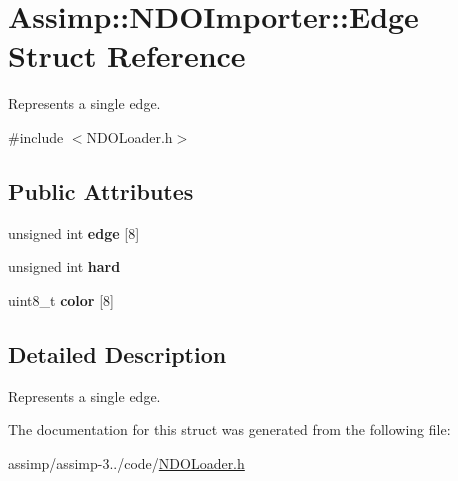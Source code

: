 \hypertarget{struct_assimp_1_1_n_d_o_importer_1_1_edge}{\section{Assimp\+:\+:N\+D\+O\+Importer\+:\+:Edge Struct Reference}
\label{struct_assimp_1_1_n_d_o_importer_1_1_edge}
}


Represents a single edge.  




{\ttfamily \#include $<$N\+D\+O\+Loader.\+h$>$}

\subsection*{Public Attributes}
\begin{DoxyCompactItemize}
\item 
\hypertarget{struct_assimp_1_1_n_d_o_importer_1_1_edge_ac715afd285e42a2427e72c70136ed252}{unsigned int {\bfseries edge} \mbox{[}8\mbox{]}}\label{struct_assimp_1_1_n_d_o_importer_1_1_edge_ac715afd285e42a2427e72c70136ed252}

\item 
\hypertarget{struct_assimp_1_1_n_d_o_importer_1_1_edge_aa2ca27b49b1045ef6af68f54a6f8e4cd}{unsigned int {\bfseries hard}}\label{struct_assimp_1_1_n_d_o_importer_1_1_edge_aa2ca27b49b1045ef6af68f54a6f8e4cd}

\item 
\hypertarget{struct_assimp_1_1_n_d_o_importer_1_1_edge_a46b6cba796b37bfdf3351516569229d4}{uint8\+\_\+t {\bfseries color} \mbox{[}8\mbox{]}}\label{struct_assimp_1_1_n_d_o_importer_1_1_edge_a46b6cba796b37bfdf3351516569229d4}

\end{DoxyCompactItemize}


\subsection{Detailed Description}
Represents a single edge. 

The documentation for this struct was generated from the following file\+:\begin{DoxyCompactItemize}
\item 
assimp/assimp-\/3../code/\hyperlink{_n_d_o_loader_8h}{N\+D\+O\+Loader.\+h}\end{DoxyCompactItemize}
